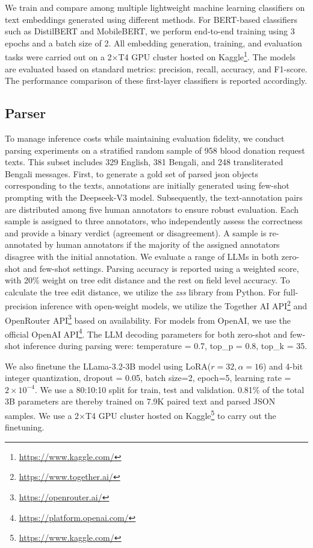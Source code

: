 \documentclass[11pt]{article}
\begin{document}
We train and compare among multiple lightweight machine learning classifiers on text embeddings generated using different methods. For BERT-based classifiers such as DistilBERT and MobileBERT, we perform end-to-end training using 3 epochs and a batch size of 2. All embedding generation, training, and evaluation tasks were carried out on a 2$\times$T4 GPU cluster hosted on Kaggle\footnote{\url{https://www.kaggle.com/}}. The models are evaluated based on standard metrics: precision, recall, accuracy, and F1-score. The performance comparison of these first-layer classifiers is reported accordingly.



\subsection{Parser}

To manage inference costs while maintaining evaluation fidelity, we conduct parsing experiments on a stratified random sample of 958 blood donation request texts. This subset includes 329 English, 381 Bengali, and 248 transliterated Bengali messages. First, to generate a gold set of parsed json objects corresponding to the texts, annotations are initially generated using few-shot prompting with the Deepseek-V3 model. Subsequently, the text-annotation pairs are distributed among five human annotators to ensure robust evaluation. Each sample is assigned to three annotators, who independently assess the correctness and provide a binary verdict (agreement or disagreement). A sample is re-annotated by human annotators if the majority of the assigned annotators disagree with the initial annotation. We evaluate a range of LLMs in both zero-shot and few-shot settings. Parsing accuracy is reported using a weighted score, with 20\% weight on tree edit distance and the rest on field level accuracy. To calculate the tree edit distance, we utilize the \textit{zss} library from Python. For full-precision inference with open-weight models, we utilize the Together AI API\footnote{\url{https://www.together.ai/}} and OpenRouter API\footnote{\url{https://openrouter.ai/}} based on availability. For models from OpenAI, we use the official OpenAI API\footnote{\url{https://platform.openai.com/}}. The LLM decoding parameters for both zero-shot and few-shot inference during parsing were: temperature = 0.7, top\_p = 0.8, top\_k = 35.

We also finetune the LLama-3.2-3B model using LoRA($r = 32, \alpha = 16$) and 4-bit integer quantization, dropout = 0.05, batch size=2, epoch=5, learning rate = $2 \times 10^{-4}$. We use a 80:10:10 split for train, test and validation. 0.81\% of the total 3B parameters are thereby trained on 7.9K paired text and parsed JSON samples. We use a 2$\times$T4 GPU cluster hosted on Kaggle\footnote{\url{https://www.kaggle.com/}} to carry out the finetuning.
\end{document}

